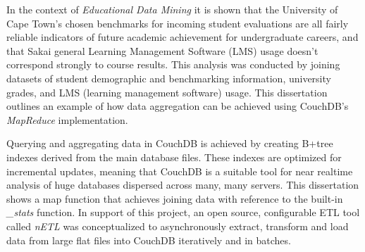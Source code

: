 In the context of \textit{Educational Data Mining} it is shown that the University of Cape Town's chosen benchmarks for incoming student evaluations are all fairly reliable indicators of future academic achievement for undergraduate careers, and that Sakai general Learning Management Software (LMS) usage doesn't correspond strongly to course results. This analysis was conducted by joining datasets of student demographic and benchmarking information, university grades, and LMS (learning management software) usage. This dissertation outlines an example of how data aggregation can be achieved using CouchDB's \textit{MapReduce} implementation.

Querying and aggregating data in CouchDB is achieved by creating B+tree indexes derived from the main database files. These indexes are optimized for incremental updates, meaning that CouchDB is a suitable tool for near realtime analysis of huge databases dispersed across many, many servers. This dissertation shows a map function that achieves joining data with reference to the built-in \textit{\_stats} function. In support of this project, an open source, configurable ETL tool called \textit{nETL} was conceptualized to asynchronously extract, transform and load data from large flat files into CouchDB iteratively and in batches.